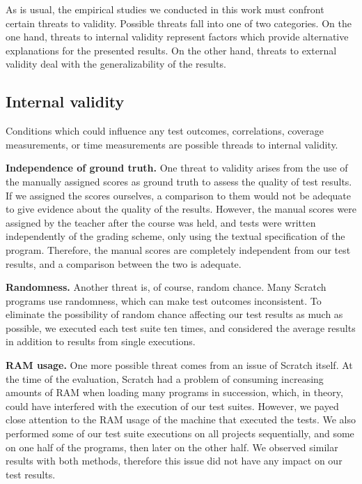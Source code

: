 As is usual, the empirical studies we conducted in this work must confront certain threats to validity.
Possible threats fall into one of two categories.
On the one hand, threats to internal validity represent factors which provide alternative explanations for the presented results.
On the other hand, threats to external validity deal with the generalizability of the results.

\subsection{Internal validity}

Conditions which could influence any test outcomes, correlations, coverage measurements,
or time measurements are possible threads to internal validity.
\parspace

\textbf{Independence of ground truth.}
One threat to validity arises from the use of the manually assigned scores as
ground truth to assess the quality of test results.
If we assigned the scores ourselves,
a comparison to them would not be adequate to give evidence about the quality of the results.
However, the manual scores were assigned by the teacher after the course was held,
and tests were written independently of the grading scheme, only using the textual specification of the program.
Therefore, the manual scores are completely independent from our test results,
and a comparison between the two is adequate.
\parspace

\textbf{Randomness.}
Another threat is, of course, random chance.
Many Scratch programs use randomness, which can make test outcomes inconsistent.
To eliminate the possibility of random chance affecting our test results as much as possible, we executed each test suite ten times,
and considered the average results in addition to results from single executions.
\parspace

\textbf{RAM usage.}
One more possible threat comes from an issue of Scratch itself.
At the time of the evaluation, Scratch had a problem of consuming increasing amounts of RAM when loading many programs in succession,
which, in theory, could have interfered with the execution of our test suites.
However, we payed close attention to the RAM usage of the machine that executed the tests.
We also performed some of our test suite executions on all projects sequentially,
and some on one half of the programs, then later on the other half.
We observed similar results with both methods, therefore this issue did not have any impact on our test results.
\parspace


